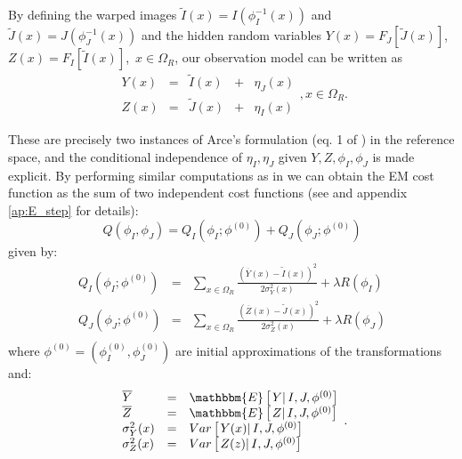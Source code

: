 By defining the warped images \hbox{$\tilde{I}(x) = I(\phi_{I}^{-1}(x))$} and \hbox{$\tilde{J}(x) = J(\phi_{J}^{-1}(x))$} and the hidden random variables
\hbox{$Y(x) = F_{J}\left[\tilde{J}(x)\right]$}, \hbox{$Z(x) = F_{I}\left[\tilde{I}(x)\right]$, $x\in\Omega_{R}$}, our observation model can be written as
\begin{equation}\label{eq:SyNEM_gom_update}
    \begin{array}{ccccc}
    	Y(x) &=& \tilde{I}(x) &+& \eta_{J}(x)\\
        Z(x) &=& \tilde{J}(x) &+& \eta_{I}(x)
    \end{array}, x\in\Omega_{R}.
\end{equation}

These are precisely two instances of Arce's formulation (eq. 1 of \cite{Arce-santana2014}) in the reference space, and the conditional independence of $\eta_{I}, \eta_{J}$
given $Y, Z, \phi_{I}, \phi_{J}$ is made explicit. By performing similar computations as in \cite{Arce-santana2014} we can obtain the EM cost function as the sum of two
independent cost functions (see \cite{Arce-santana2014} and appendix \ref{ap:E_step} for details):
\begin{equation}\label{eq:SyNEM_energy}
    Q(\phi_{I}, \phi_{J}) = Q_{I}(\phi_{I}; \phi^{(0)}) + Q_{J}(\phi_{J}; \phi^{(0)})
\end{equation}
given by:
\begin{equation}\label{eq:SyNEM_energy_split}
    \begin{array}{lll}
        Q_{I}(\phi_{I}; \phi^{(0)}) &=& \sum_{x \in \Omega_{R}} \frac{\left(\overline{Y}(x) - \tilde{I}(x)\right)^{2}}{2\sigma^{2}_{Y}(x)} + \lambda R(\phi_{I}) \\
        Q_{J}(\phi_{J}; \phi^{(0)}) &=& \sum_{x \in \Omega_{R}} \frac{\left(\overline{Z}(x) - \tilde{J}(x)\right)^{2}}{2\sigma^{2}_{Z}(x)} + \lambda R(\phi_{J}) \\
    \end{array}
\end{equation}
where $\phi^{(0)} = (\phi_{I}^{(0)}, \phi_{J}^{(0)})$ are initial approximations of the transformations and:
\begin{equation}\label{eq:E_Step_stats}
    \begin{array}{lll}
        \overline{Y} &=& \mathbbm{E}\left[\left.Y \right| I, J, \phi^{(0)}\right]\\
        \overline{Z} &=& \mathbbm{E}\left[\left.Z \right| I, J, \phi^{(0)}\right]\\
        \sigma_{Y}^{2}(x) &=& Var\left[\left.Y(x) \right| I, J, \phi^{(0)}\right]\\
        \sigma_{Z}^{2}(x) &=& Var\left[\left.Z(z) \right| I, J, \phi^{(0)}\right]
    \end{array}.
\end{equation}
